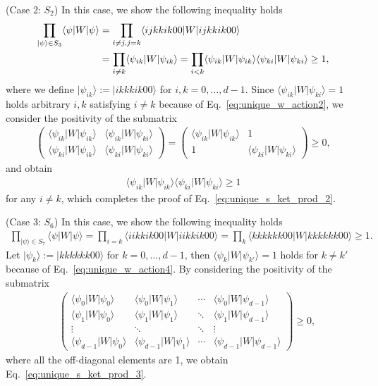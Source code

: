 \documentclass[a4paper,twocolumn,accepted=2022-10-23]{quantumarticle}
\newcommand{\bra}[1]{\langle {#1} \vert}
\newcommand{\ket}[1]{\vert {#1} \rangle}
\theoremstyle{definition}
\begin{document}
(Case 2: $S_2$) \quad
In this case, we show the following inequality holds
\begin{align}
\prod_{\ket{\psi} \in S_3} \bra{\psi} W \ket{\psi}
&= \prod_{ i \neq j, j = k} \bra{ijkkik00} W \ket{ijkkik00} \notag \\
&= \prod_{ i \neq k} \bra{\psi_{ik}} W \ket{\psi_{ik}}
= \prod_{ i < k} \bra{\psi_{ik}} W \ket{\psi_{ik}} \bra{\psi_{ki}} W \ket{\psi_{ki}}
\geq 1, \label{eq:unique_s_ket_prod_2}
\end{align}
where we define $\ket{\psi_{ik}} :=  \ket{ikkkik00} $ for $i,k=0,\ldots,d-1$.
Since $\bra{\psi_{ik}} W \ket{\psi_{ki}} = 1$ holds arbitrary $i,k$ satisfying $i \neq k$ because of Eq.~\eqref{eq:unique_w_action2},
we consider the positivity of the submatrix
\begin{align}
\begin{pmatrix}
\bra{\psi_{ik}} W \ket{\psi_{ik}} & \bra{\psi_{ik}} W \ket{\psi_{ki}} \\
\bra{\psi_{ki}} W \ket{\psi_{ik}} & \bra{\psi_{ki}} W \ket{\psi_{ki}}
\end{pmatrix}
=
\begin{pmatrix}
\bra{\psi_{ik}} W \ket{\psi_{ik}} & 1 \\
1 & \bra{\psi_{ki}} W \ket{\psi_{ki}}
\end{pmatrix}
\geq 0,
\end{align}
and obtain
\begin{align}
\bra{\psi_{ik}} W \ket{\psi_{ik}} \bra{\psi_{ki}} W \ket{\psi_{ki}}  \geq 1
\end{align}
for any $i \neq k$,
which completes the proof of Eq.~\eqref{eq:unique_s_ket_prod_2}.




(Case 3: $S_6$) \quad
In this case, we show the following inequality holds
\begin{align}
\prod_{\ket{\psi} \in S_7} \bra{\psi} W \ket{\psi}
= \prod_{ i = k} \bra{iikkik00} W \ket{iikkik00}
= \prod_{k} \bra{kkkkkk00} W \ket{kkkkkk00}
\geq 1. \label{eq:unique_s_ket_prod_3}
\end{align}
Let $\ket{\psi_k} := \ket{kkkkkk00}$ for $k=0,\ldots,d-1$,
then $\bra{\psi_k} W \ket{\psi_{k'}} = 1$ holds for $k \neq k'$ because of Eq.~\eqref{eq:unique_w_action4}.
By considering the positivity of the submatrix
\begin{align}
&\begin{pmatrix}
\bra{\psi_0} W \ket{\psi_0} & \bra{\psi_0} W \ket{\psi_1} & \cdots & \bra{\psi_0} W \ket{\psi_{d-1}} \\
\bra{\psi_1} W \ket{\psi_0} & \bra{\psi_1} W \ket{\psi_1} & \ddots & \bra{\psi_1} W \ket{\psi_{d-1}} \\
\vdots & \ddots & \ddots & \vdots \\
\bra{\psi_{d-1}} W \ket{\psi_0} & \bra{\psi_{d-1}} W \ket{\psi_1} & \cdots & \bra{\psi_{d-1}} W \ket{\psi_{d-1}}
\end{pmatrix}
\geq 0,
\end{align}
where all the off-diagonal elements are 1,
we obtain Eq.~\eqref{eq:unique_s_ket_prod_3}.
\end{document}
